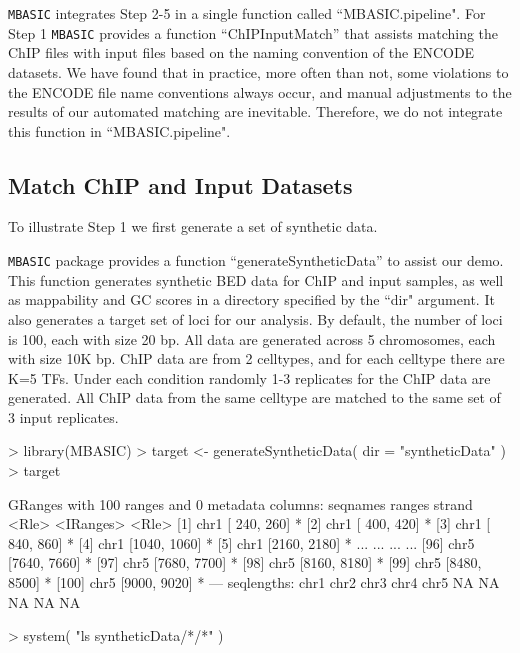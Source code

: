 \documentclass[a4paper,10pt]{article}
\begin{document}
\texttt{MBASIC} integrates Step 2-5 in a single function called ``MBASIC.pipeline". For Step 1 \texttt{MBASIC} provides a function ``ChIPInputMatch'' that assists matching the ChIP files with input files based on the naming convention of the ENCODE datasets. We have found that in practice, more often than not, some violations to the ENCODE file name conventions always occur, and manual adjustments to the results of our automated matching are inevitable. Therefore, we do not integrate this function in ``MBASIC.pipeline".

\subsection{Match ChIP and Input Datasets}


To illustrate Step 1 we first generate a set of synthetic data.

\texttt{MBASIC} package provides a function ``generateSyntheticData'' to assist our demo. This function generates synthetic BED data for ChIP and input samples, as well as mappability and GC scores in a directory specified by the ``dir" argument. It also generates a target set of loci for our analysis. By default, the number of loci is 100, each with size 20 bp. All data are generated across 5 chromosomes, each with size 10K bp. ChIP data are from 2 celltypes, and for each celltype there are K=5 TFs. Under each condition randomly 1-3 replicates for the ChIP data are generated. All ChIP data from the same celltype are matched to the same set of 3 input replicates. 

\begin{Schunk}
\begin{Sinput}
> library(MBASIC)
> target <- generateSyntheticData( dir = "syntheticData" )
> target
\end{Sinput}
\begin{Soutput}
GRanges with 100 ranges and 0 metadata columns:
        seqnames       ranges strand
           <Rle>    <IRanges>  <Rle>
    [1]     chr1 [ 240,  260]      *
    [2]     chr1 [ 400,  420]      *
    [3]     chr1 [ 840,  860]      *
    [4]     chr1 [1040, 1060]      *
    [5]     chr1 [2160, 2180]      *
    ...      ...          ...    ...
   [96]     chr5 [7640, 7660]      *
   [97]     chr5 [7680, 7700]      *
   [98]     chr5 [8160, 8180]      *
   [99]     chr5 [8480, 8500]      *
  [100]     chr5 [9000, 9020]      *
  ---
  seqlengths:
   chr1 chr2 chr3 chr4 chr5
     NA   NA   NA   NA   NA
\end{Soutput}
\begin{Sinput}
> system( "ls syntheticData/*/*" )
\end{Sinput}
\end{Schunk}
\end{document}
